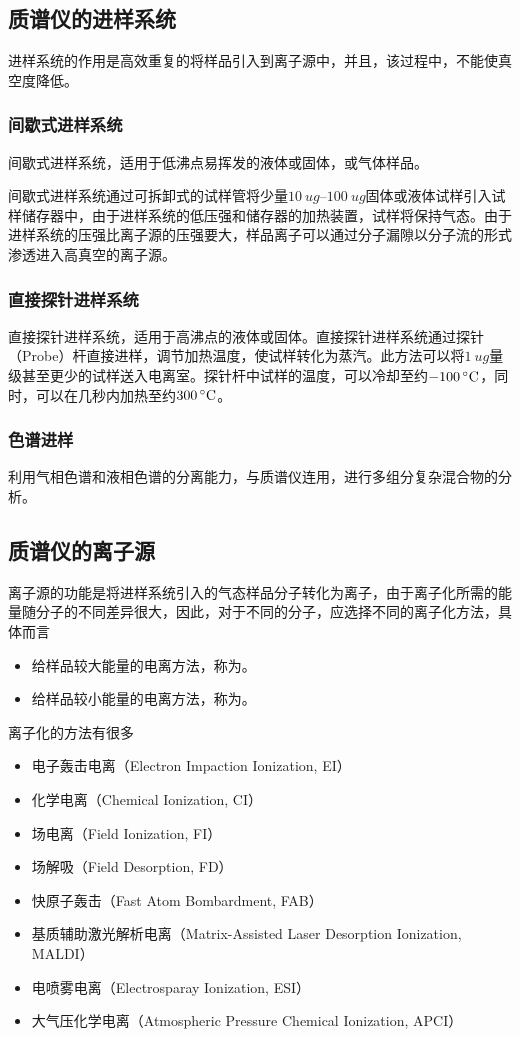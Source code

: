 \subsection{质谱仪的进样系统}
进样系统的作用是高效重复的将样品引入到离子源中，并且，该过程中，不能使真空度降低。

\subsubsection{间歇式进样系统}
间歇式进样系统，适用于低沸点易挥发的液体或固体，或气体样品。

间歇式进样系统通过可拆卸式的试样管将少量$\SIrange{10}{100}{ug}$固体或液体试样引入试样储存器中，由于进样系统的低压强和储存器的加热装置，试样将保持气态。由于进样系统的压强比离子源的压强要大，样品离子可以通过分子漏隙以分子流的形式渗透进入高真空的离子源。

\subsubsection{直接探针进样系统}
直接探针进样系统，适用于高沸点的液体或固体。直接探针进样系统通过探针（Probe）杆直接进样，调节加热温度，使试样转化为蒸汽。此方法可以将$\SI{1}{ug}$量级甚至更少的试样送入电离室。探针杆中试样的温度，可以冷却至约$\SI{-100}{\dc}$，同时，可以在几秒内加热至约$\SI{300}{\dc}$。

\subsubsection{色谱进样}
利用气相色谱和液相色谱的分离能力，与质谱仪连用，进行多组分复杂混合物的分析。

\subsection{质谱仪的离子源}
离子源的功能是将进样系统引入的气态样品分子转化为离子，由于离子化所需的能量随分子的不同差异很大，因此，对于不同的分子，应选择不同的离子化方法，具体而言
\begin{itemize}
    \item 给样品较大能量的电离方法，称为。
    \item 给样品较小能量的电离方法，称为。
\end{itemize}
离子化的方法有很多
\begin{itemize}
    \item 电子轰击电离（Electron Impaction Ionization, EI）
    \item 化学电离（Chemical Ionization, CI）
    \item 场电离（Field Ionization, FI）
    \item 场解吸（Field Desorption, FD）
    \item 快原子轰击（Fast Atom Bombardment, FAB）
    \item 基质辅助激光解析电离（Matrix-Assisted Laser Desorption Ionization, MALDI）
    \item 电喷雾电离（Electrosparay Ionization, ESI）
    \item 大气压化学电离（Atmospheric Pressure Chemical Ionization, APCI）
\end{itemize}

